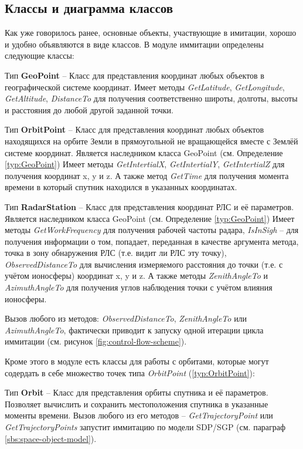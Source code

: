 \subsection{Классы и диаграмма классов}

Как уже говорилось ранее, основные объекты, участвующие в имитации, хорошо и удобно объявляются в виде классов. В
модуле иммитации определены следующие классы:
\begin{mydef} \label{typ:GeoPoint}
Тип \textbf{GeoPoint} -- Класс для представления координат любых объектов в географической системе координат. 
Имеет методы \textit{GetLatitude}, \textit{GetLongitude}, \textit{GetAltitude}, \textit{DistanceTo} для получения соответственно широты, долготы, высоты и расстояния до любой другой заданной точки.
\end{mydef}
\begin{mydef} \label{typ:OrbitPoint}
Тип \textbf{OrbitPoint} -- Класс для представления координат любых объектов находящихся на орбите Земли 
в прямоугольной не вращающейся вместе с Землёй системе координат. Является наследником класса GeoPoint 
(см. Определение \ref{typ:GeoPoint})
Имеет методы \textit{GetIntertialX}, \textit{GetIntertialY}, \textit{GetIntertialZ} для получения 
координат x, y и z. А также метод \textit{GetTime} для получения момента времени в который спутник находился в 
указанных координатах.
\end{mydef}
\begin{mydef} \label{typ:RadarStation}
Тип \textbf{RadarStation} -- Класс для представления координат РЛС и её параметров. Является наследником класса 
GeoPoint (см. Определение \ref{typ:GeoPoint})
Имеет методы \textit{GetWorkFrequency} для получения рабочей частоты радара, \textit{IsInSigh} -- для получения
информации о том, попадает, переданная в качестве аргумента метода, точка в зону обнаружения РЛС (т.е. видит ли РЛС
эту точку), \textit{ObservedDistanceTo} для вычисления измеряемого расстояния до точки (т.е. с учётом ионосферы)
координат x, y и z. А также методы \textit{ZenithAngleTo} и \textit{AzimuthAngleTo} для получения углов наблюдения 
точки с учётом влияния ионосферы.
\end{mydef}

Вызов любого из методов: \textit{ObservedDistanceTo}, \textit{ZenithAngleTo} или \textit{AzimuthAngleTo}, фактически
приводит к запуску одной итерации цикла иммитации (см. рисунок \ref{fig:control-flow-scheme}).

Кроме этого в модуле есть классы для работы с орбитами, которые могут содердать в себе множество точек типа 
\textit{OrbitPoint} (\ref{typ:OrbitPoint}):
\begin{mydef} \label{typ:Orbit}
Тип \textbf{Orbit} -- Класс для представления орбиты спутника и её параметров. Позволяет вычислить и сохранить
местоположения спутника в указанные моменты времени. Вызов любого из его методов -- \textit{GetTrajectoryPoint} 
или \textit{GetTrajectoryPoints} запустит иммитацию по модели SDP/SGP (см. параграф \ref{sbs:space-object-model}).
\end{mydef}

